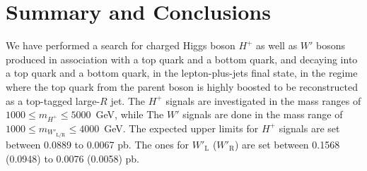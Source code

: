\section{Summary and Conclusions}
\label{sec:Summary}

We have performed a search for charged Higgs boson $H^{+}$ as well as $W'$ bosons produced in association with a top quark and a bottom quark, and decaying into a top quark and a bottom quark, in the lepton-plus-jets final state, in the regime where the top quark from the parent boson is highly boosted to be reconstructed as a top-tagged large-$R$ jet. The $H^{+}$ signals are investigated in the mass ranges of $1000 \leq m_{H^{+}} \leq 5000$~GeV, while The $W'$ signals are done in the mass range of $1000 \leq m_{W'_{\text{L/R}}} \leq 4000$~GeV. The expected upper limits for $H^{+}$ signals are set between 0.0889 to 0.0067 pb. The ones for $W'_{\text{L}}$ ($W'_{\text{R}}$) are set between 0.1568 (0.0948) to 0.0076 (0.0058) pb.